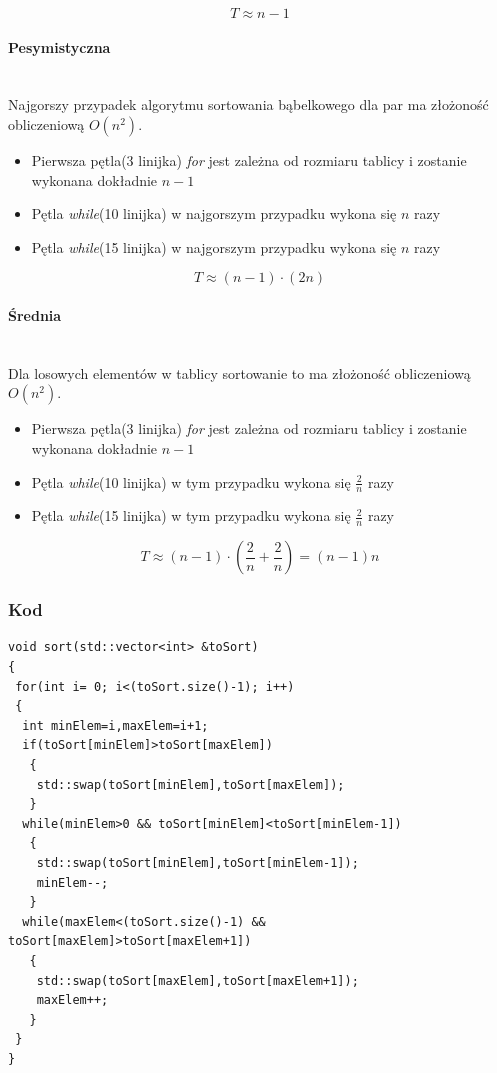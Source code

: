 \begin{equation*}
T \approx n -1
\end{equation*}
\wyjT
\paragraph{Pesymistyczna}\mbox{}\\
Najgorszy przypadek algorytmu sortowania bąbelkowego dla par ma złożoność obliczeniową $O(n^2)$.
\begin{itemize}
\item Pierwsza pętla(3 linijka) \textit{for} jest zależna od rozmiaru tablicy i zostanie wykonana dokładnie $n-1$
\item Pętla \textit{while}(10 linijka)  w najgorszym przypadku wykona się $n$ razy
\item Pętla \textit{while}(15 linijka)  w najgorszym przypadku wykona się $n$ razy
\end{itemize}
\begin{equation*}
T \approx (n -1) \cdot (2n) 
\end{equation*}
\wyjT
\paragraph{Średnia}\mbox{}\\
Dla losowych elementów w tablicy sortowanie to ma złożoność obliczeniową $O(n^2)$.
\begin{itemize}
\item Pierwsza pętla(3 linijka) \textit{for} jest zależna od rozmiaru tablicy i zostanie wykonana dokładnie $n-1$
\item Pętla \textit{while}(10 linijka)  w tym przypadku wykona się $\frac{2}{n}$ razy
\item Pętla \textit{while}(15 linijka)  w tym przypadku wykona się $\frac{2}{n}$ razy
\end{itemize}
\begin{equation*}
T \approx (n -1)\cdot (  \frac{2}{n} + \frac{2}{n}) = (n-1)n
\end{equation*}
\wyjT


\subsubsection{Kod}

\begin{lstlisting}[caption={Sortowanie bąbelkowe dla par},label={lst:babelek}]
void sort(std::vector<int> &toSort)
{
 for(int i= 0; i<(toSort.size()-1); i++)
 {
  int minElem=i,maxElem=i+1;
  if(toSort[minElem]>toSort[maxElem])
   {
    std::swap(toSort[minElem],toSort[maxElem]);
   }
  while(minElem>0 && toSort[minElem]<toSort[minElem-1])
   {
    std::swap(toSort[minElem],toSort[minElem-1]);
    minElem--;
   }
  while(maxElem<(toSort.size()-1) && toSort[maxElem]>toSort[maxElem+1])
   {
    std::swap(toSort[maxElem],toSort[maxElem+1]);
    maxElem++;
   } 
 }
}
\end{lstlisting}
